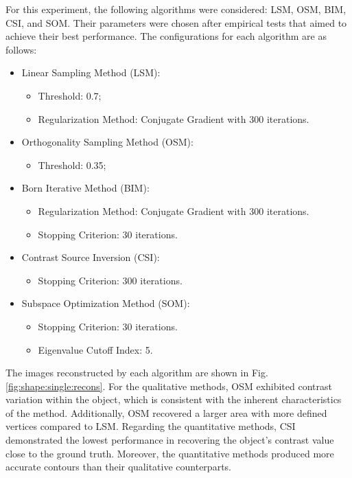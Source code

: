 \documentclass{IEEEtran}
\begin{document}
                For this experiment, the following algorithms were considered: LSM, OSM, BIM, CSI, and SOM. Their parameters were chosen after empirical tests that aimed to achieve their best performance. The configurations for each algorithm are as follows:
                \begin{itemize}
                    \item Linear Sampling Method (LSM):
                    \begin{itemize}
                        \item Threshold: 0.7;
                        \item Regularization Method: Conjugate Gradient with 300 iterations.
                    \end{itemize}
                    \item Orthogonality Sampling Method (OSM):
                    \begin{itemize}
                        \item Threshold: 0.35;
                    \end{itemize}
                    \item Born Iterative Method (BIM):
                    \begin{itemize}
                        \item Regularization Method: Conjugate Gradient with 300 iterations.
                        \item Stopping Criterion: 30 iterations.
                    \end{itemize}
                    \item Contrast Source Inversion (CSI):
                    \begin{itemize}
                        \item Stopping Criterion: 300 iterations.
                    \end{itemize}
                    \item Subspace Optimization Method (SOM):
                    \begin{itemize}
                        \item Stopping Criterion: 30 iterations.
                        \item Eigenvalue Cutoff Index: 5.
                    \end{itemize}
                \end{itemize}

                The images reconstructed by each algorithm are shown in Fig. \ref{fig:shape:single:recons}. For the qualitative methods, OSM exhibited contrast variation within the object, which is consistent with the inherent characteristics of the method. Additionally, OSM recovered a larger area with more defined vertices compared to LSM. Regarding the quantitative methods, CSI demonstrated the lowest performance in recovering the object's contrast value close to the ground truth. Moreover, the quantitative methods produced more accurate contours than their qualitative counterparts.
\end{document}

